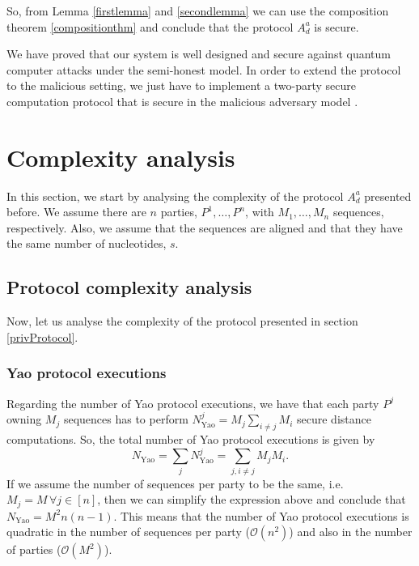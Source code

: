 So, from Lemma \ref{firstlemma} and \ref{secondlemma} we can use the composition theorem \ref{compositionthm} and conclude that the protocol $A^a_d$ is secure.

We have proved that our system is well designed and secure against quantum computer attacks under the semi-honest model. In order to extend the protocol to the malicious setting, we just have to implement a two-party secure computation protocol that is secure in the malicious adversary model \cite{Evans2018}. 




\section{Complexity analysis}\label{CompleAnalysis}


In this section, we start by analysing the complexity of the protocol $A^a_d$ presented before. We assume there are $n$ parties, $P^1, \ldots, P^n$, with $M_1, \ldots, M_n$ sequences, respectively. Also, we assume that the sequences are aligned and that they have the same number of nucleotides, $s$.


\subsection{Protocol complexity analysis}\label{compAnalysis}

Now, let us analyse the complexity of the protocol presented in section \ref{privProtocol}. 

\subsubsection{Yao protocol executions}
Regarding the number of Yao protocol executions, we have that each party $P^j$ owning $M_j$ sequences has to perform $N_{\text{Yao}}^j = M_j\sum_{i\neq j} M_i$ secure distance computations. So, the total number of Yao protocol executions is given by
$$N_{\text{Yao}} = \sum_j N_{\text{Yao}}^j = \sum_{j, i\neq j} M_j M_i.$$
If we assume the number of sequences per party to be the same, i.e. $M_j = M\, \forall j\in[n]$, then we can simplify the expression above and conclude that $N_{\text{Yao}} = M^2 n(n-1)$. This means that the number of Yao protocol executions is quadratic in the number of sequences per party ($\mathcal{O}(n^2)$) and also in the number of parties ($\mathcal{O}(M^2)$). 

